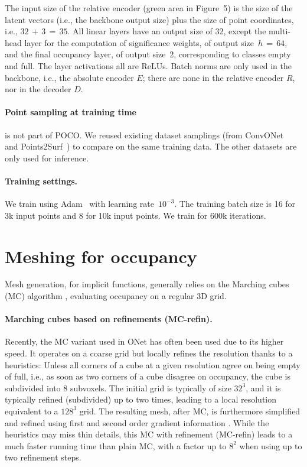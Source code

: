 \documentclass[10pt,twocolumn,letterpaper]{article}
\newcommand\OURS{{POCO}}
\newcommand{\decoder}{D}
\newcommand{\encoder}{E}
\newcommand{\relativizer}{R}
\begin{document}
The input size of the relative encoder (green area in Figure~5) is the size of the latent vectors (i.e., the backbone output size) plus the size of point coordinates, i.e., $32\,{+}\,3\,{=}\,35$. All linear layers have an output size of 32, except the multi-head layer for the computation of significance weights, of output size~$h\,{=}\,64$, and the final occupancy layer, of output size~2, corresponding to classes empty and full.
The layer activations all are ReLUs.
Batch norms are only used in the backbone, i.e., the absolute encoder $\encoder$; there are none in the relative encoder $\relativizer$, nor in the decoder $\decoder$.

\paragraph{Point sampling at training time} 
is not part of {\OURS}. We reused existing dataset samplings (from ConvONet~\cite{Peng2020ECCV} and Points2Surf~\cite{Erler2020Points2Surf}) to compare on the same training data. The other datasets are only used for inference.

\paragraph{Training settings.}

We train using Adam~\cite{Kingma2015ICML} with learning rate~$10^{-3}$.
The training batch size is 16 for 3k input points and 8 for 10k input points.
We train for 600k iterations.


\section{Meshing for occupancy}\label{sec:meshoccup}

Mesh generation, for implicit functions, generally relies on the Marching cubes (MC) algorithm \cite{Lorensen1987CG}, evaluating occupancy on a regular 3D grid.

\paragraph{Marching cubes based on refinements (MC-refin).}
Recently, the MC variant used in ONet \cite{Mescheder2019CVPR} has often been used due to its higher speed. It operates on a coarse grid but locally refines the resolution thanks to a heuristics:
Unless all corners of a cube at a given resolution agree on being empty of full, i.e., as soon as two corners of a cube disagree on occupancy, the cube is subdivided into 8 subvoxels. The initial grid is typically of size $32^3$, and it is typically refined (subdivided) up to two times, leading to a local resolution equivalent to a $128^3$ grid. The resulting mesh, after MC, is furthermore simplified \cite{Garland1998Simplifying} and refined using first and second order gradient information \cite{Mescheder2019CVPR}. While the heuristics may miss thin details, this MC with refinement (MC-refin) leads to a much faster running time than plain MC, with a factor up to $8^2$ when using up to two refinement steps.
\end{document}
